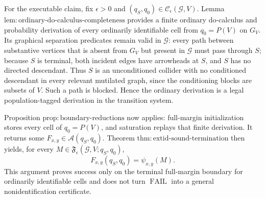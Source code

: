 For the executable claim, fix \(\epsilon>0\) and \((q_S,q_0)\in\mathcal C_{\epsilon}(\mathcal G,V)\). Lemma \(\mathrm{lem{:}ordinary\text{-}do\text{-}calculus\text{-}completeness}\) provides a finite ordinary do-calculus and probability derivation of every ordinarily identifiable cell from \(q_0=P(V)\) on \(G_V\). Its graphical separation predicates remain valid in \(\mathcal G\): every path between substantive vertices that is absent from \(G_V\) but present in \(\mathcal G\) must pass through \(S\); because \(S\) is terminal, both incident edges have arrowheads at \(S\), and \(S\) has no directed descendant. Thus \(S\) is an unconditioned collider with no conditioned descendant in every relevant mutilated graph, since the conditioning blocks are subsets of \(V\). Such a path is blocked. Hence the ordinary derivation is a legal population-tagged derivation in the transition system.

Proposition \(\mathrm{prop{:}boundary\text{-}reductions}\) now applies: full-margin initialization stores every cell of \(q_0=P(V)\), and saturation replays that finite derivation. It returns some \(F_{x,y}\in\mathcal A(q_S,q_0)\). Theorem \(\mathrm{thm{:}extid\text{-}sound\text{-}termination}\) then yields, for every \(M\in\mathfrak F_{\epsilon}(\mathcal G,V;q_S,q_0)\),
\[
 F_{x,y}(q_S,q_0)=\psi_{x,y}(M).
 \tag{6}
\]
This argument proves success only on the terminal full-margin boundary for ordinarily identifiable cells and does not turn \(\operatorname{FAIL}\) into a general nonidentification certificate.